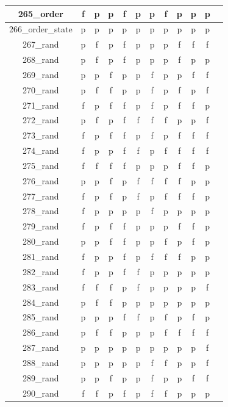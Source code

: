 \documentclass[
fancyheadings, %
%
%
]{stsreprt}
\begin{document}
\begin{longtable}{|c|c|c|c|c|c|c|c|c|c|c|c|}
\hline
265\_order & f & p & p & f & p & p & f & p & p & p \\
\hline
266\_order\_state & p & p & p & p & p & p & p & p & p & p \\
\hline
267\_rand & p & f & p & f & p & p & p & f & f & f \\
\hline
268\_rand & p & f & p & f & p & p & p & f & p & p \\
\hline
269\_rand & p & p & f & p & p & f & p & p & f & f \\
\hline
270\_rand & p & f & f & p & p & f & p & f & p & f \\
\hline
271\_rand & f & p & f & f & p & f & p & f & f & p \\
\hline
272\_rand & p & f & p & f & f & f & f & p & p & f \\
\hline
273\_rand & f & p & f & f & p & f & p & f & f & f \\
\hline
274\_rand & f & p & p & f & f & p & f & f & f & f \\
\hline
275\_rand & f & f & f & f & p & p & p & f & f & p \\
\hline
276\_rand & p & p & f & p & f & f & f & f & p & p \\
\hline
277\_rand & f & p & f & p & f & p & f & f & f & p \\
\hline
278\_rand & f & p & p & p & p & f & p & p & p & p \\
\hline
279\_rand & f & p & f & f & p & p & p & f & f & p \\
\hline
280\_rand & p & p & f & f & p & p & f & p & f & p \\
\hline
281\_rand & f & p & p & f & p & f & f & f & p & p \\
\hline
282\_rand & f & p & p & f & f & p & p & p & p & p \\
\hline
283\_rand & f & f & f & p & f & p & p & p & p & f \\
\hline
284\_rand & p & f & f & p & p & p & p & p & p & p \\
\hline
285\_rand & p & p & p & f & f & p & f & p & f & p \\
\hline
286\_rand & p & f & f & p & p & p & f & f & f & f \\
\hline
287\_rand & p & p & p & p & p & p & p & p & p & f \\
\hline
288\_rand & p & p & p & p & p & f & f & p & p & f \\
\hline
289\_rand & p & p & f & p & p & f & p & p & f & f \\
\hline
290\_rand & f & f & p & f & p & f & f & p & p & p \\

\end{longtable}
\end{document}
